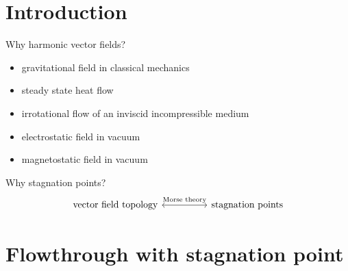 \section{Introduction}
{
\begin{frame}[fragile]
  Why harmonic vector fields?
  \begin{itemize}
    \item gravitational field in classical mechanics
    \item steady state heat flow
    \item irrotational flow of an inviscid incompressible medium
    \item electrostatic field in vacuum
    \item magnetostatic field in vacuum
  \end{itemize}
  \tikzset{external/export=false}
  Why stagnation points?
  \[\begin{tikzcd}[column sep=huge]
    \text{vector field topology} \arrow[r,leftrightarrow,"\text{Morse theory}"] &\text{stagnation points}
  \end{tikzcd}\]
\end{frame}
}


\section{Flowthrough with stagnation point}

